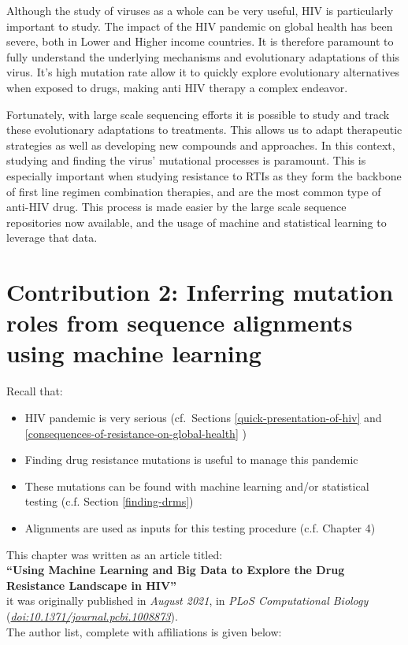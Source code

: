 \documentclass[
  11pt,
  twoside]{scrbook}
\begin{document}
Although the study of viruses as a whole can be very useful, HIV is particularly important to study. The impact of the HIV pandemic on global health has been severe, both in Lower and Higher income countries. It is therefore paramount to fully understand the underlying mechanisms and evolutionary adaptations of this virus. It's high mutation rate allow it to quickly explore evolutionary alternatives when exposed to drugs, making anti HIV therapy a complex endeavor.

Fortunately, with large scale sequencing efforts it is possible to study and track these evolutionary adaptations to treatments. This allows us to adapt therapeutic strategies as well as developing new compounds and approaches. In this context, studying and finding the virus' mutational processes is paramount. This is especially important when studying resistance to RTIs as they form the backbone of first line regimen combination therapies, and are the most common type of anti-HIV drug. This process is made easier by the large scale sequence repositories now available, and the usage of machine and statistical learning to leverage that data.

\printbibliography[segment=\therefsegment,heading=subbibintoc,title={References for chapter \thechapter}]

\hypertarget{HIV-paper}{%
\chapter{Contribution 2: Inferring mutation roles from sequence alignments using machine learning}\label{HIV-paper}}

Recall that:

\begin{itemize}
\item
  HIV pandemic is very serious (cf.~Sections \ref{quick-presentation-of-hiv} and \ref{consequences-of-resistance-on-global-health} )
\item
  Finding drug resistance mutations is useful to manage this pandemic
\item
  These mutations can be found with machine learning and/or statistical testing (c.f. Section \ref{finding-drms})
\item
  Alignments are used as inputs for this testing procedure (c.f. Chapter 4)
\end{itemize}

This chapter was written as an article titled:\\
\textbf{``Using Machine Learning and Big Data to Explore the Drug Resistance Landscape in HIV''}\\
it was originally published in \emph{August 2021}, in \emph{PLoS Computational Biology}
(\href{https://doi.org/10.1371/journal.pcbi.1008873}{\emph{doi:10.1371/journal.pcbi.1008873}}).\\
The author list, complete with affiliations is given below:\\
\strut \\
\end{document}
